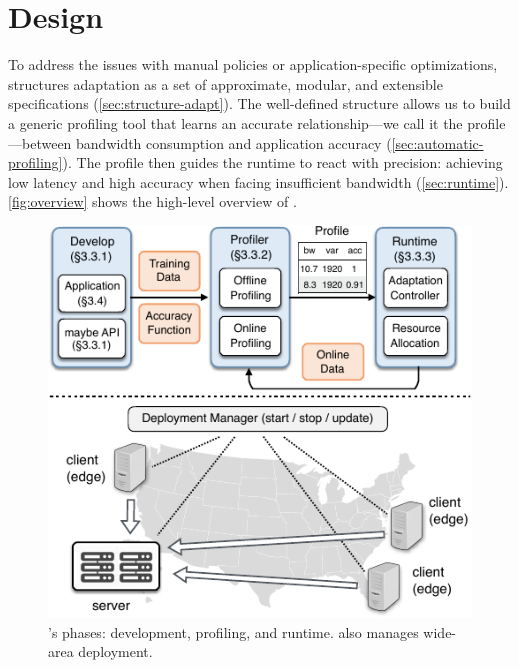 \section{\awstream{} Design}
\label{sec:system}

To address the issues with manual policies or application-specific
optimizations, \awstream{} structures adaptation as a set of approximate,
modular, and extensible specifications (\autoref{sec:structure-adapt}). The
well-defined structure allows us to build a generic profiling tool that learns
an accurate relationship---we call it the profile---between bandwidth
consumption and application accuracy (\autoref{sec:automatic-profiling}). The
profile then guides the runtime to react with precision: achieving low latency
and high accuracy when facing insufficient bandwidth
(\autoref{sec:runtime}). \autoref{fig:overview} shows the high-level overview of
\awstream{}.

\begin{figure}
  \centering
  \includegraphics[width=0.8\linewidth]{figures/system.pdf}
  \caption{\awstream{}'s phases: development, profiling, and
    runtime. \awstream{} also manages wide-area deployment.}
  \label{fig:overview}
\end{figure}





